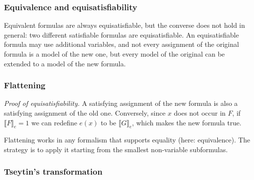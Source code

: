 \subsubsection*{Equivalence and equisatisfiability}
 
 
 
Equivalent formulas are always equisatisfiable, but the converse does not hold in general: two different satisfiable formulas are equisatisfiable. An equisatisfiable formula may use additional variables, and not every assignment of the original formula is a model of the new one, but every model of the original can be extended to a model of the new formula.
 
\subsubsection*{Flattening}
 
 
\emph{Proof of equisatisfiability.} A satisfying assignment of the new formula is also a satisfying assignment of the old one. Conversely, since $x$ does not occur in $F$, if $\llbracket F \rrbracket_e = 1$ we can redefine $e(x)$ to be $\llbracket G \rrbracket_e$, which makes the new formula true.
 
Flattening works in any formalism that supports equality (here: equivalence). The strategy is to apply it starting from the smallest non-variable subformulas.
 
\subsubsection*{Tseytin's transformation}
 
